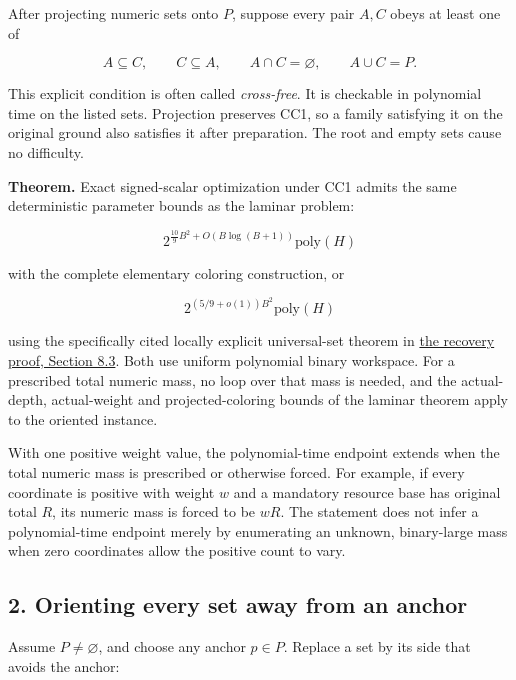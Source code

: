 After projecting numeric sets onto \(P\), suppose every pair \(A,C\) obeys at least one of

\[
A\subseteq C,\qquad C\subseteq A,\qquad
A\cap C=\varnothing,\qquad A\cup C=P.
\tag{CC1}
\]

This explicit condition is often called \emph{cross-free}. It is checkable in polynomial time on the listed sets. Projection preserves CC1, so a family satisfying it on the original ground also satisfies it after preparation. The root and empty sets cause no difficulty.

\textbf{Theorem.} Exact signed-scalar optimization under CC1 admits the same deterministic parameter bounds as the laminar problem:

\[
2^{\frac{10}{9}B^2+O(B\log(B+1))}\mathrm{poly}(H)
\tag{CC2}
\]

with the complete elementary coloring construction, or

\[
2^{(5/9+o(1))B^2}\mathrm{poly}(H)
\tag{CC3}
\]

using the specifically cited locally explicit universal-set theorem in \href{https://github.com/icekylinx/algorithm-frontier/blob/main/problems/weighted-prefix-quota-frontier/manuscripts/laminar-dominant-weight-recovery.md\#83-the-precise-published-construction-and-the-space-claim}{the recovery proof, Section 8.3}. Both use uniform polynomial binary workspace. For a prescribed total numeric mass, no loop over that mass is needed, and the actual-depth, actual-weight and projected-coloring bounds of the laminar theorem apply to the oriented instance.

With one positive weight value, the polynomial-time endpoint extends when the total numeric mass is prescribed or otherwise forced. For example, if every coordinate is positive with weight \(w\) and a mandatory resource base has original total \(R\), its numeric mass is forced to be \(wR\). The statement does not infer a polynomial-time endpoint merely by enumerating an unknown, binary-large mass when zero coordinates allow the positive count to vary.

\hypertarget{af-3beb839889-orienting-every-set-away-from-an-anchor}{%
\subsection{2. Orienting every set away from an anchor}\label{af-3beb839889-orienting-every-set-away-from-an-anchor}}

Assume \(P\ne\varnothing\), and choose any anchor \(p\in P\). Replace a set by its side that avoids the anchor:


